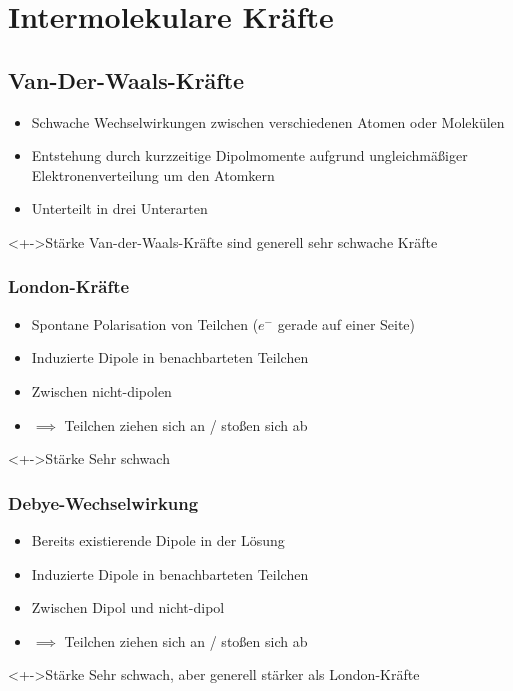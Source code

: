 \chapter{Intermolekulare Kräfte}
\section{Van-Der-Waals-Kräfte}

\begin{itemize}
	\item<+-> Schwache Wechselwirkungen zwischen verschiedenen Atomen oder Molekülen
	\item<+-> Entstehung durch kurzzeitige Dipolmomente aufgrund ungleichmäßiger Elektronenverteilung um den Atomkern
	\item<+-> Unterteilt in drei Unterarten
\end{itemize}
\begin{block}<+->{Stärke}
	Van-der-Waals-Kräfte sind generell sehr schwache Kräfte
\end{block}


\subsection{London-Kräfte}

\begin{itemize}
	\item<+-> Spontane Polarisation von Teilchen ($e^-$  gerade auf einer Seite)
	\item<+-> Induzierte Dipole in benachbarteten Teilchen
	\item<+-> Zwischen nicht-dipolen
	\item<+-> $\implies$ Teilchen ziehen sich an / stoßen sich ab
\end{itemize}
\begin{block}<+->{Stärke}
	Sehr schwach
\end{block}


\subsection{Debye-Wechselwirkung}

\begin{itemize}
	\item<+-> Bereits existierende Dipole in der Lösung
	\item<+-> Induzierte Dipole in benachbarteten Teilchen
	\item<+-> Zwischen Dipol und nicht-dipol
	\item<+-> $\implies$ Teilchen ziehen sich an / stoßen sich ab
\end{itemize}
\begin{block}<+->{Stärke}
	Sehr schwach, aber generell stärker als London-Kräfte
\end{block}



